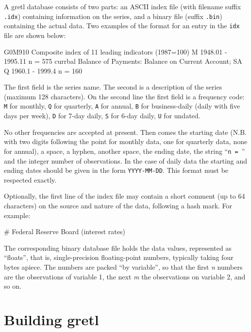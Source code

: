 A gretl database consists of two parts: an ASCII index file (with
filename suffix \texttt{.idx}) containing information on the series,
and a binary file (suffix \texttt{.bin}) containing the actual data.
Two examples of the format for an entry in the \texttt{idx} file are
shown below:

\begin{code}
G0M910  Composite index of 11 leading indicators (1987=100) 
M 1948.01 - 1995.11  n = 575
currbal Balance of Payments: Balance on Current Account; SA 
Q 1960.1 - 1999.4 n = 160
\end{code}

The first field is the series name.  The second is a description of
the series (maximum 128 characters).  On the second line the first
field is a frequency code: \texttt{M} for monthly, \texttt{Q} for
quarterly, \texttt{A} for annual, \texttt{B} for business-daily (daily
with five days per week), \texttt{D} for 7-day daily, \texttt{S} for
6-day daily, \texttt{U} for undated.

No other frequencies are accepted at present.  Then comes the starting
date (N.B. with two digits following the point for monthly data, one
for quarterly data, none for annual), a space, a hyphen, another
space, the ending date, the string ``\verb+n = +'' and the integer
number of observations. In the case of daily data the starting and
ending dates should be given in the form \verb+YYYY-MM-DD+. This
format must be respected exactly.

Optionally, the first line of the index file may contain a short
comment (up to 64 characters) on the source and nature of the data,
following a hash mark.  For example:

\begin{code}
# Federal Reserve Board (interest rates)
\end{code}

The corresponding binary database file holds the data values,
represented as ``floats'', that is, single-precision floating-point
numbers, typically taking four bytes apiece.  The numbers are packed
``by variable'', so that the first \emph{n} numbers are the
observations of variable 1, the next \emph{m} the observations on
variable 2, and so on.



\chapter{Building gretl}
\label{app-build}

